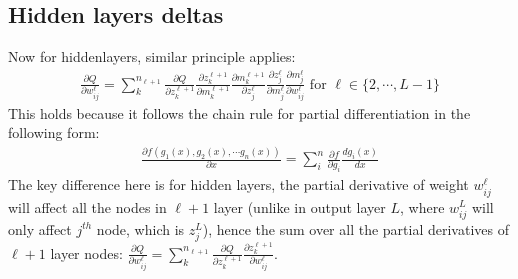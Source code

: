 \documentclass{article} [10pt] %
\begin{document}
\subsection{Hidden layers deltas}
Now for hiddenlayers, similar principle applies:
\begin{align} \label{eq:hidden_delta}
\boxed{
	\frac{\partial Q}{\partial w^\ell_{ij}} = \sum_k^{n_{\ell+1}}\frac{\partial Q}{\partial z^{\ell+1}_{k}}
							\frac{\partial z^{\ell+1}_{k}}{\partial m^{\ell+1}_{k}}
							\frac{\partial m^{\ell+1}_{k}}{\partial z^\ell_j}
							\frac{\partial z^\ell_j}{\partial m^\ell_{j}}
							\frac{\partial m^\ell_{j}}{\partial w^\ell_{ij}}
\text{ for } \ell \in \{2, \cdots, L-1\}
}
\end{align}
This holds because it follows the chain rule for partial differentiation in the following form:
\begin{align*}
	\frac{\partial f(g_1(x), g_2(x), \cdots g_n(x))}{\partial x} = \sum_i^n \frac{\partial f}{\partial g_i}\frac{d g_i(x)}{dx}
\end{align*}
The key difference here is for hidden layers, the partial derivative of weight $w^\ell_{ij}$ will affect all the nodes in $\ell+1$ layer (unlike in output layer $L$, where $w^L_{ij}$ will only affect $j^{th}$ node, which is $z^L_j$), hence the sum over all the partial derivatives of $\ell+1$ layer nodes: $\frac{\partial Q}{\partial w^\ell_{ij}} = \sum_k^{n_{\ell+1}}\frac{\partial Q}{\partial z^{\ell+1}_{k}}\frac{\partial z^{\ell+1}_{k}}{\partial w^\ell_{ij}}$.
\end{document}
